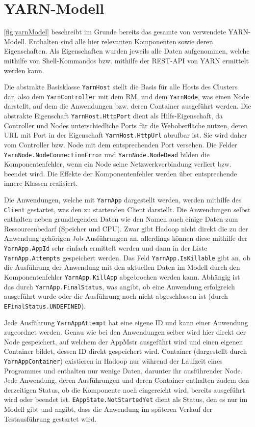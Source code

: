 \section{YARN-Modell}\label{sec:yarnModel}

\autoref{fig:yarnModel} beschreibt im Grunde bereits das gesamte von \sS verwendete YARN-Modell. Enthalten sind alle hier relevanten Komponenten sowie deren Eigenschaften. Als Eigenschaften wurden jeweils alle Daten aufgenommen, welche mithilfe von Shell-Kommandos bzw. mithilfe der REST-API von YARN ermittelt werden kann.

Die abstrakte Basisklasse \texttt{YarnHost} stellt die Basis für alle Hosts des Clusters dar, also dem \texttt{YarnController} mit dem \ac{RM}, und dem \texttt{YarnNode}, was einen Node darstellt, auf dem die Anwendungen bzw. deren Container ausgeführt werden. Die abstrakte Eigenschaft \texttt{YarnHost.HttpPort} dient als Hilfs-Eigenschaft, da Controller und Nodes unterschiedliche Ports für die Weboberfläche nutzen, deren URL mit Port in der Eigenschaft \texttt{YarnHost.HttpUrl} abrufbar ist. Sie wird daher vom Controller bzw. Node mit dem entsprechenden Port versehen. Die Felder \texttt{YarnNode.NodeConnectionError} und \texttt{YarnNode.NodeDead} bilden die Komponentenfehler, wenn ein Node seine Netzwerkverbindung verliert bzw. beendet wird. Die Effekte der Komponentenfehler werden über entsprechende innere Klassen realisiert.

Die Anwendungen, welche mit \texttt{YarnApp} dargestellt werden, werden mithilfe des \texttt{Client} gestartet, was den zu startenden Client darstellt. Die Anwendungen selbst enthalten neben grundlegenden Daten wie \zB den Namen auch einige Daten zum Ressourcenbedarf (Speicher und CPU). Zwar gibt Hadoop nicht direkt die zu der Anwendung gehörigen Job-Ausführungen an, allerdings können diese mithilfe der \texttt{YarnApp.AppId} sehr einfach ermittelt werden und dann in der Liste \texttt{YarnApp.Attempts} gespeichert werden. Das Feld \texttt{YarnApp.IsKillable} gibt an, ob die Ausführung der Anwendung mit den aktuellen Daten im Modell durch den Komponentenfehler \texttt{YarnApp.KillApp} abgebrochen werden kann. Abhängig ist das durch \texttt{YarnApp.FinalStatus}, was angibt, ob eine Anwendung erfolgreich ausgeführt wurde oder die Ausführung noch nicht abgeschlossen ist (durch \texttt{EFinalStatus.UNDEFINED}).

Jede Ausführung \texttt{YarnAppAttempt} hat eine eigene ID und kann einer Anwendung zugeordnet werden. Genau wie bei den Anwendungen selber wird hier direkt der Node gespeichert, auf welchem der \ac{AppMstr} ausgeführt wird und einen eigenen Container bildet, dessen ID direkt gespeichert wird. Container (dargestellt durch \texttt{YarnAppContainer}) existieren in Hadoop nur während der Laufzeit eines Programmes und enthalten nur wenige Daten, darunter ihr ausführender Node. Jede Anwendung, deren Ausführungen und deren Container enthalten zudem den derzeitigen Status, ob die Komponente noch eingereicht wird, bereits ausgeführt wird oder beendet ist. \texttt{EAppState.NotStartedYet} dient als Status, den es nur im Modell gibt und angibt, dass die Anwendung im späteren Verlauf der Testausführung gestartet wird.

